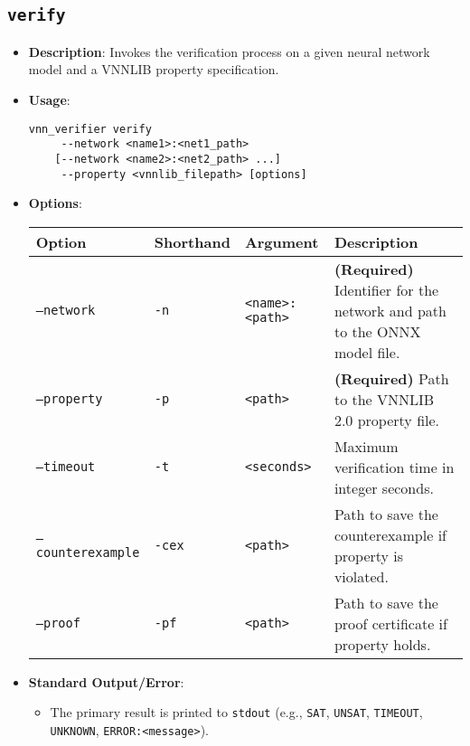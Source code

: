 \subsection{\texttt{verify}}
\begin{itemize}
    \item \textbf{Description}: Invokes the verification process on a given neural network model and a VNNLIB property specification.
    \item \textbf{Usage}:
    \begin{lstlisting}[style=bash]
vnn_verifier verify
	 --network <name1>:<net1_path> 
	[--network <name2>:<net2_path> ...] 
	 --property <vnnlib_filepath> [options] \end{lstlisting}
    \item \textbf{Options}:
    \begin{longtable}{@{}>{\raggedright\arraybackslash\ttfamily}p{}%
                    >{\raggedright\arraybackslash\ttfamily}p{}%
                    >{\raggedright\arraybackslash\ttfamily}p{}%
                    >{\raggedright\arraybackslash}p{}@{}}%
        \toprule
        Option & Shorthand & Argument & Description \\
        \midrule
        \bottomrule
        \texttt{--network} & \texttt{-n} & \texttt{<name>:<path>} & \textbf{(Required)} Identifier for the network and path to the ONNX model file. \\
        \texttt{--property} & \texttt{-p} & \texttt{<path>} & \textbf{(Required)} Path to the VNNLIB 2.0 property file. \\
        \texttt{--timeout} & \texttt{-t} & \texttt{<seconds>} & Maximum verification time in integer seconds. \\
        \texttt{--counterexample} & \texttt{-cex} & \texttt{<path>} & Path to save the counterexample if property is violated. \\
        \texttt{--proof} & \texttt{-pf} & \texttt{<path>} & Path to save the proof certificate if property holds. \\
    \end{longtable}
    \item \textbf{Standard Output/Error}:
    \begin{itemize}
        \item The primary result is printed to \texttt{stdout} (e.g., \texttt{SAT}, \texttt{UNSAT}, \texttt{TIMEOUT}, \texttt{UNKNOWN}, \texttt{ERROR:\@<message>}).

\end{itemize}
\end{itemize}

